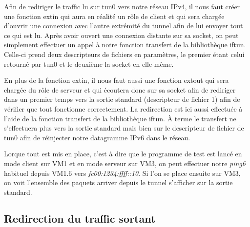 \documentclass[a4paper, 12pt]{article}
\begin{document}
    Afin de rediriger le traffic lu sur tun0 vers notre réseau IPv4, il nous
    faut créer une fonction extin qui aura en réalité un rôle de client et qui
    sera chargée d'ouvrir une connexion avec l'autre extrémité du tunnel afin
    de lui envoyer tout ce qui est lu. Après avoir ouvert une connexion 
    distante sur sa socket, on peut simplement effectuer un appel à notre 
    fonction transfert de la bibliothèque iftun. Celle-ci prend deux 
    descripteurs de fichiers en paramètres, le premier étant celui retourné par
    tun0 et le deuxième la socket en elle-même.

    \medbreak{}

    En plus de la fonction extin, il nous faut aussi une fonction extout qui 
    sera chargée du rôle de serveur et qui écoutera donc sur sa socket afin de 
    rediriger dans un premier temps vers la sortie standard (descripteur de 
    fichier 1) afin de vérifier que tout fonctionne correctement. La 
    redirection est ici aussi effectuée à l'aide de la fonction transfert de la
    bibliothèque iftun. À terme le transfert ne s'effectuera plus vers la sortie 
    standard mais bien sur le descripteur de fichier de tun0 afin de réinjecter
    notre datagramme IPv6 dans le réseau.

    \medbreak{}

    Lorque tout est  mis en place, c'est à dire que le programme de test est
    lancé en mode client sur VM1 et en mode serveur sur VM3, on peut effectuer 
    notre \textit{ping6} habituel depuis VM1.6 vers 
    \textit{fc00:1234:ffff::10}. Si l'on se place ensuite sur VM3, on voit 
    l'ensemble des paquets arriver depuis le tunnel s'afficher sur la sortie
    standard.

    \subsection{Redirection du traffic sortant}
\end{document}
